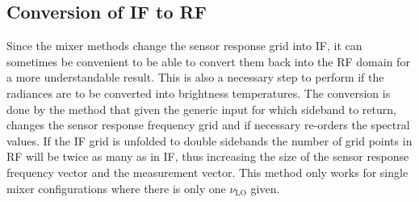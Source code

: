 \subsection{Conversion of IF to RF}
Since the mixer methods change the sensor response grid into IF, it
can sometimes be convenient to be able to convert them back into the
RF domain for a more understandable result. This is also a necessary
step to perform if the radiances are to be converted into brightness
temperatures. The conversion is done by the method
 that given the generic input for which
sideband to return, changes the sensor response frequency grid and if
necessary re-orders the spectral values. If the IF grid is unfolded to
double sidebands the number of grid points in RF will be twice as many
as in IF, thus increasing the size of the sensor response frequency
vector and the measurement vector. This method only works for single
mixer configurations where there is only one $\nu_\mathrm{LO}$ given.


